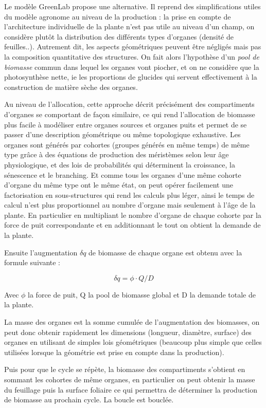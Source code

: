 {Le modèle GreenLab propose une alternative. Il reprend des simplifications utiles du modèle agronome au niveau de la production : la prise en compte de l’architecture individuelle de la plante n’est pas utile au niveau d’un champ, on considère plutôt la distribution des différents types d'organes (densité de feuilles..). Autrement dit, les aspects géométriques peuvent être négligés mais pas la composition quantitative des structures. On fait alors l’hypothèse d’un \emph{pool de biomasse} commun dans lequel les organes vont piocher, et on ne considère que la photosynthèse nette, ie les proportions de glucides qui servent effectivement à la construction de matière sèche des organes. 

Au niveau de l’allocation, cette approche décrit précisément des compartiments d’organes se comportant de façon similaire, ce qui rend l’allocation de biomasse plus facile à modéliser entre organes sources et organes puits et permet de se passer d’une description géométrique ou même topologique exhaustive. Les organes sont générés par cohortes (groupes générés en même temps) de même type grâce à des équations de production des méristèmes selon leur âge physiologique, et des lois de probabilités qui déterminent la croissance, la sénescence et le branching. Et comme tous les organes d’une même cohorte d’organe du même type ont le même état, on peut opérer facilement une factorisation en sous-structures qui rend les calculs plus léger, ainsi le temps de calcul n’est plus proportionnel au nombre d’organe mais seulement à l’âge de la plante. En particulier en multipliant le nombre d’organe de chaque cohorte par la force de puit correspondante et en additionnant le tout on obtient la demande de la plante.

Ensuite l’augmentation $\delta q$ de biomasse de chaque organe est obtenu avec la formule suivante :

\[ \delta q = \phi \cdot Q/D \]

Avec $\phi$ la force de puit, Q la pool de biomasse global et D la demande totale de la plante.

La masse des organes est la somme cumulée de l’augmentation des biomasses, on peut donc obtenir rapidement les dimensions (longueur, diamètre, surface) des organes en utilisant de simples lois géométriques (beaucoup plus simple que celles utilisées lorsque la géométrie est prise en compte dans la production). 

Puis pour que le cycle se répète, la biomasse des compartiments s’obtient  en sommant les cohortes de même organes, en particulier on peut obtenir la masse du feuillage puis la surface foliaire ce qui permettra de déterminer la production de biomasse au prochain cycle. La boucle est bouclée.

}
